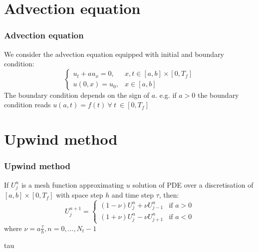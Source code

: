 \documentclass{beamer}
\begin{document}
\section{Advection equation}
\begin{frame}
\frametitle{Advection equation}
We consider the advection equation equipped with initial and boundary condition:
$$
\begin{cases}
u_t + a u_x = 0, & x,t \in [a,b] \times [0,T_f] \\
u(0,x) = u_0, & x \in [a,b]
\end{cases}
$$
The boundary condition depends on the sign of $a$. e.g. if $a > 0$ the boundary condition reads $u(a,t) = f(t) \ \forall \ t \ \in [0,T_f]$
\end{frame}
\section{Upwind method}
\begin{frame}
\frametitle{Upwind method}
If $U_j^n$ is a mesh function approximating $u$ solution of PDE over a discretisation of $[a,b] \times [0,T_f]$ with space step $h$ and time step $\tau$, then:
$$
U_j^{n+1} =
\begin{cases}
(1 - \nu) U_j^n + \nu U_{j - 1}^n & \text{if } a > 0 \\
(1 + \nu) U_j^n - \nu U_{j + 1}^n & \text{if } a < 0
\end{cases}
$$
where $\nu = a \frac{\tau}{h}, n = 0, ..., N_t - 1$
\end{frame}
\begin{frame}
tau
\end{frame}
\end{document}
